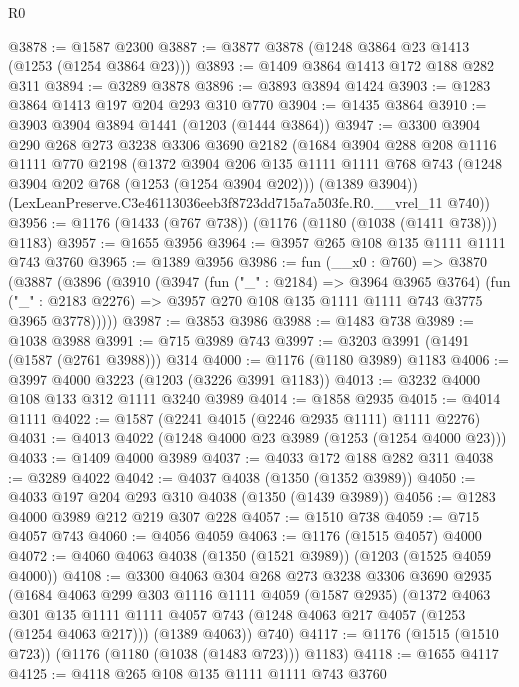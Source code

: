 \begin{lexlean}{R0}
\begin{coremodule}
@3878 := @1587 @2300
@3887 := @3877 @3878 (@1248 @3864 @23 @1413 (@1253 (@1254 @3864 @23)))
@3893 := @1409 @3864 @1413 @172 @188 @282 @311
@3894 := @3289 @3878
@3896 := @3893 @3894 @1424
@3903 := @1283 @3864 @1413 @197 @204 @293 @310 @770
@3904 := @1435 @3864
@3910 := @3903 @3904 @3894 @1441 (@1203 (@1444 @3864))
@3947 := @3300
    @3904
    @290
    @268
    @273
    @3238
    @3306
    @3690
    @2182
    (@1684
      @3904
      @288
      @208
      @1116
      @1111
      @770
      @2198
      (@1372
        @3904
        @206
        @135
        @1111
        @1111
        @768
        @743
        (@1248 @3904 @202 @768 (@1253 (@1254 @3904 @202)))
        (@1389 @3904))
      (LexLeanPreserve.C3e46113036eeb3f8723dd715a7a503fe.R0.__vrel_11 @740))
@3956 := @1176 (@1433 (@767 @738)) (@1176 (@1180 (@1038 (@1411 @738))) @1183)
@3957 := @1655 @3956
@3964 := @3957 @265 @108 @135 @1111 @1111 @743 @3760
@3965 := @1389 @3956
@3986 := fun (__x0 : @760) =>
  @3870
    (@3887
      (@3896
        (@3910
          (@3947
            (fun ("_" : @2184) => @3964 @3965 @3764)
            (fun ("_" : @2183 @2276) => @3957 @270 @108 @135 @1111 @1111 @743 @3775 @3965 @3778)))))
@3987 := @3853 @3986
@3988 := @1483 @738
@3989 := @1038 @3988
@3991 := @715 @3989 @743
@3997 := @3203 @3991 (@1491 (@1587 (@2761 @3988))) @314
@4000 := @1176 (@1180 @3989) @1183
@4006 := @3997 @4000 @3223 (@1203 (@3226 @3991 @1183))
@4013 := @3232 @4000 @108 @133 @312 @1111 @3240 @3989
@4014 := @1858 @2935
@4015 := @4014 @1111
@4022 := @1587 (@2241 @4015 (@2246 @2935 @1111) @1111 @2276)
@4031 := @4013 @4022 (@1248 @4000 @23 @3989 (@1253 (@1254 @4000 @23)))
@4033 := @1409 @4000 @3989
@4037 := @4033 @172 @188 @282 @311
@4038 := @3289 @4022
@4042 := @4037 @4038 (@1350 (@1352 @3989))
@4050 := @4033 @197 @204 @293 @310 @4038 (@1350 (@1439 @3989))
@4056 := @1283 @4000 @3989 @212 @219 @307 @228
@4057 := @1510 @738
@4059 := @715 @4057 @743
@4060 := @4056 @4059
@4063 := @1176 (@1515 @4057) @4000
@4072 := @4060 @4063 @4038 (@1350 (@1521 @3989)) (@1203 (@1525 @4059 @4000))
@4108 := @3300
    @4063
    @304
    @268
    @273
    @3238
    @3306
    @3690
    @2935
    (@1684
      @4063
      @299
      @303
      @1116
      @1111
      @4059
      (@1587 @2935)
      (@1372
        @4063
        @301
        @135
        @1111
        @1111
        @4057
        @743
        (@1248 @4063 @217 @4057 (@1253 (@1254 @4063 @217)))
        (@1389 @4063))
      @740)
@4117 := @1176 (@1515 (@1510 @723)) (@1176 (@1180 (@1038 (@1483 @723))) @1183)
@4118 := @1655 @4117
@4125 := @4118 @265 @108 @135 @1111 @1111 @743 @3760

\end{coremodule}
\end{lexlean}
